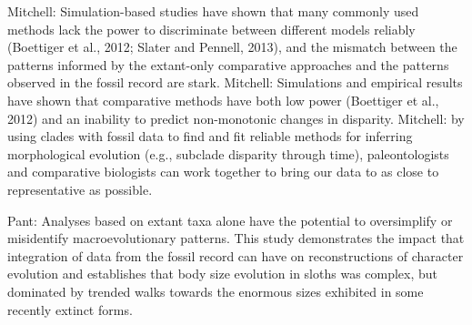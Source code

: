 Mitchell: Simulation-based studies have shown that many commonly used methods lack the power to discriminate between different models reliably (Boettiger et al., 2012; Slater and Pennell, 2013), and the mismatch between the patterns informed by the extant-only comparative approaches and the patterns observed in the fossil record are stark.
Mitchell: Simulations and empirical results have shown that comparative methods have both low power (Boettiger et al., 2012) and an inability to predict non-monotonic changes in disparity.
Mitchell: by using clades with fossil data to find and fit reliable methods for inferring morphological evolution (e.g., subclade disparity through time), paleontologists and comparative biologists can work together to bring our data to as close to representative as possible.

Pant: Analyses based on extant taxa alone have the potential to oversimplify or misidentify macroevolutionary patterns. This study demonstrates the impact that integration of data from the fossil record can have on reconstructions of character evolution and establishes that body size evolution in sloths was complex, but dominated by trended walks towards the enormous sizes exhibited in some recently extinct forms.

%